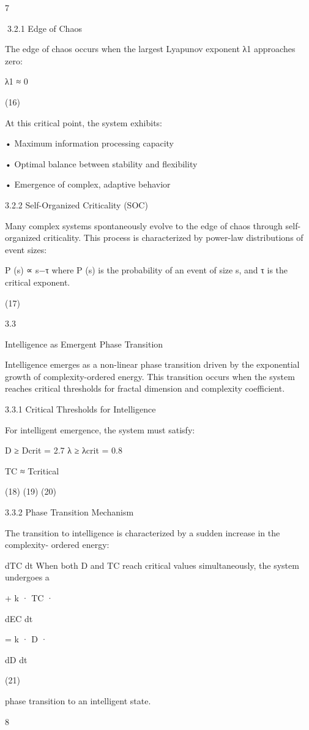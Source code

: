 7

3.2.1 Edge of Chaos

The edge of chaos occurs when the largest Lyapunov exponent λ1 approaches zero:

λ1 ≈ 0

(16)

At this critical point, the system exhibits:

• Maximum information processing capacity

• Optimal balance between stability and flexibility

• Emergence of complex, adaptive behavior

3.2.2 Self-Organized Criticality (SOC)

Many complex systems spontaneously evolve to the edge of chaos through self-organized
criticality. This process is characterized by power-law distributions of event sizes:

P (s) ∝ s−τ
where P (s) is the probability of an event of size s, and τ is the critical exponent.

(17)

3.3

Intelligence as Emergent Phase Transition

Intelligence emerges as a non-linear phase transition driven by the exponential growth
of complexity-ordered energy. This transition occurs when the system reaches critical
thresholds for fractal dimension and complexity coefficient.

3.3.1 Critical Thresholds for Intelligence

For intelligent emergence, the system must satisfy:

D ≥ Dcrit = 2.7
λ ≥ λcrit = 0.8

TC ≈ Tcritical

(18)
(19)
(20)

3.3.2 Phase Transition Mechanism

The transition to intelligence is characterized by a sudden increase in the complexity-
ordered energy:

dTC
dt
When both D and TC reach critical values simultaneously, the system undergoes a

+ k · TC ·

dEC
dt

= k · D ·

dD
dt

(21)

phase transition to an intelligent state.

8

